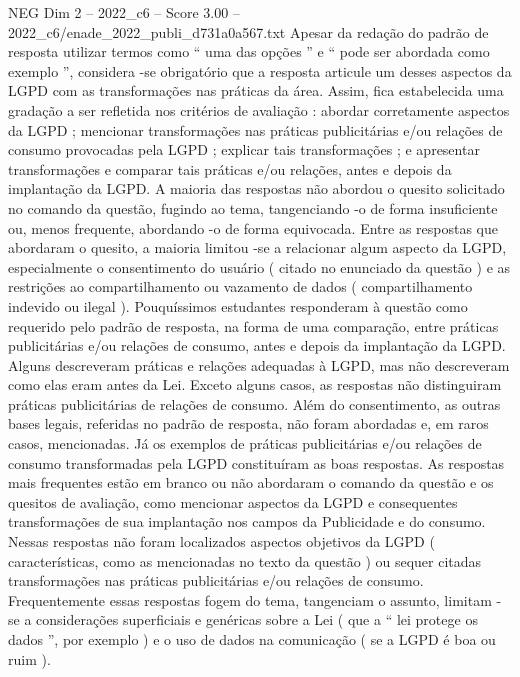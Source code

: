 \begin{textsample}{NEG Dim 2 – 2022\_c6 – Score 3.00 – 2022\_c6/enade\_2022\_publi\_d731a0a567.txt}
Apesar da redação do padrão de resposta utilizar termos como “ uma das opções ” e “ pode ser abordada como exemplo ”, considera -se obrigatório que a resposta articule um desses aspectos da LGPD com as transformações nas práticas da área.
Assim, fica estabelecida uma gradação a ser refletida nos critérios de avaliação : abordar corretamente aspectos da LGPD ; mencionar transformações nas práticas publicitárias e/ou relações de consumo provocadas pela LGPD ; explicar tais transformações ; e apresentar transformações e comparar tais práticas e/ou relações, antes e depois da implantação da LGPD.
A maioria das respostas não abordou o quesito solicitado no comando da questão, fugindo ao tema, tangenciando -o de forma insuficiente ou, menos frequente, abordando -o de forma equivocada.
Entre as respostas que abordaram o quesito, a maioria limitou -se a relacionar algum aspecto da LGPD, especialmente o consentimento do usuário ( citado no enunciado da questão ) e as restrições ao compartilhamento ou vazamento de dados ( compartilhamento indevido ou ilegal ).
Pouquíssimos estudantes responderam à questão como requerido pelo padrão de resposta, na forma de uma comparação, entre práticas publicitárias e/ou relações de consumo, antes e depois da implantação da LGPD.
Alguns descreveram práticas e relações adequadas à LGPD, mas não descreveram como elas eram antes da Lei.
Exceto alguns casos, as respostas não distinguiram práticas publicitárias de relações de consumo.
Além do consentimento, as outras bases legais, referidas no padrão de resposta, não foram abordadas e, em raros casos, mencionadas.
Já os exemplos de práticas publicitárias e/ou relações de consumo transformadas pela LGPD constituíram as boas respostas.
As respostas mais frequentes estão em branco ou não abordaram o comando da questão e os quesitos de avaliação, como mencionar aspectos da LGPD e consequentes transformações de sua implantação nos campos da Publicidade e do consumo.
Nessas respostas não foram localizados aspectos objetivos da LGPD ( características, como as mencionadas no texto da questão ) ou sequer citadas transformações nas práticas publicitárias e/ou relações de consumo.
Frequentemente essas respostas fogem do tema, tangenciam o assunto, limitam -se a considerações superficiais e genéricas sobre a Lei ( que a “ lei protege os dados ”, por exemplo ) e o uso de dados na comunicação ( se a LGPD é boa ou ruim ).

\end{textsample}
